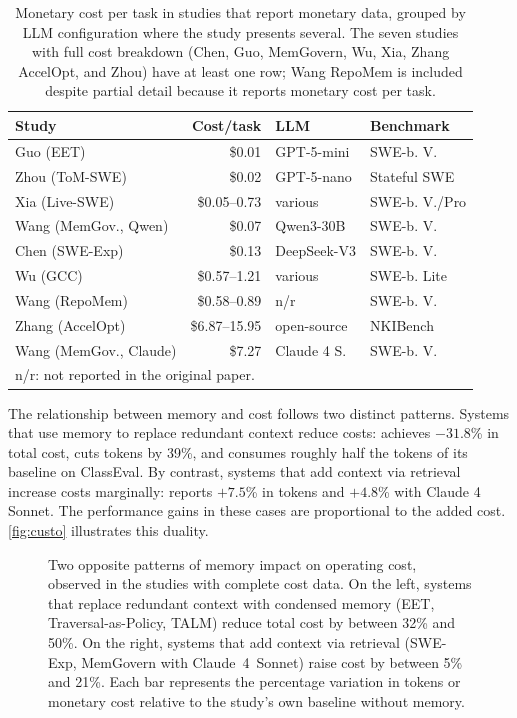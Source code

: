 \begin{table}[htbp]
  \centering
  \caption{Monetary cost per task in studies that report monetary data,
    grouped by LLM configuration where the study presents several.
    The seven studies with full cost breakdown (Chen, Guo, MemGovern,
    Wu, Xia, Zhang AccelOpt, and Zhou) have at least one row; Wang
    RepoMem is included despite partial detail because it reports
    monetary cost per task.}
  \label{tab:custo}
  \begin{tabular}{l r l l}
    \toprule
    Study & Cost/task & LLM & Benchmark \\
    \midrule
    Guo (EET) & \$0.01 & GPT-5-mini & SWE-b. V. \\
    Zhou (ToM-SWE) & \$0.02 & GPT-5-nano & Stateful SWE \\
    Xia (Live-SWE) & \$0.05--0.73 & various & SWE-b. V./Pro \\
    Wang (MemGov., Qwen) & \$0.07 & Qwen3-30B & SWE-b. V. \\
    Chen (SWE-Exp) & \$0.13 & DeepSeek-V3 & SWE-b. V. \\
    Wu (GCC) & \$0.57--1.21 & various & SWE-b. Lite \\
    Wang (RepoMem) & \$0.58--0.89 & n/r & SWE-b. V. \\
    Zhang (AccelOpt) & \$6.87--15.95 & open-source & NKIBench \\
    Wang (MemGov., Claude) & \$7.27 & Claude 4 S. & SWE-b. V. \\
    \midrule
    \multicolumn{4}{l}{\footnotesize n/r: not reported in the original paper.} \\
    \bottomrule
  \end{tabular}
\end{table}

The relationship between memory and cost follows two distinct patterns.
Systems that use memory to replace redundant context reduce costs:
\citet{guo2026eet} achieves $-31.8$\% in total cost,
\citet{li2026traversalaspolicy} cuts tokens by 39\%, and
\citet{shen2025talm} consumes roughly half the tokens of its baseline
on ClassEval.
By contrast, systems that add context via retrieval increase costs
marginally:
\citet{chen2025sweexp} reports $+7.5$\% in tokens and
\citet{wang2026memgovern} $+4.8$\% with Claude 4 Sonnet.
The performance gains in these cases are proportional to the added
cost.
\autoref{fig:custo} illustrates this duality.

\begin{figure}[!htbp]
  \centering
  \resizebox{\textwidth}{!}{}
  \caption{Two opposite patterns of memory impact on operating cost,
    observed in the studies with complete cost data.
    On the left, systems that replace redundant context with
    condensed memory (EET, Traversal-as-Policy, TALM) reduce total
    cost by between 32\% and 50\%.
    On the right, systems that add context via retrieval (SWE-Exp,
    MemGovern with Claude~4~Sonnet) raise cost by between 5\% and
    21\%.
    Each bar represents the percentage variation in tokens or
    monetary cost relative to the study's own baseline without
    memory.}
  \label{fig:custo}
\end{figure}

